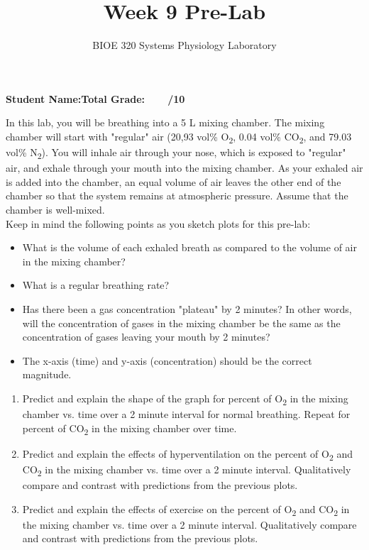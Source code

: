 \documentclass{article}
\title{Week 9 Pre-Lab}
\author{BIOE 320 Systems Physiology Laboratory}
\date{}
\begin{document}
\maketitle
\large

\textbf{Student Name:}\hfill 	\textbf{Total Grade:\ \ \ \ /10}\vspace{0.5cm}

In this lab, you will be breathing into a 5 L mixing chamber. The mixing chamber will start with "regular" air (20,93 vol\% O\textsubscript{2}, 0.04 vol\% CO\textsubscript{2}, and 79.03 vol\% N\textsubscript{2}). You will inhale air through your nose, which is exposed to "regular" air, and exhale through your mouth into the mixing chamber. As your exhaled air is added into the chamber, an equal volume of air leaves the other end of the chamber so that the system remains at atmospheric pressure. Assume that the chamber is well-mixed.\\

Keep in mind the following points as you sketch plots for this pre-lab:\begin{itemize}
	\item What is the volume  of each exhaled breath as compared to the volume of air in the mixing chamber?
	\item What is a regular breathing rate?
	\item Has there been a gas concentration "plateau" by 2 minutes? In other words, will the concentration of gases in the mixing chamber be the same as the concentration of gases leaving your mouth by 2 minutes?
	\item The x-axis (time) and y-axis (concentration) should be the correct magnitude.
\end{itemize}

\begin{enumerate}
	\item Predict and explain the shape of the graph for percent of O\textsubscript{2} in the mixing chamber vs. time over a 2 minute interval for normal breathing. Repeat for percent of CO\textsubscript{2} in the mixing chamber over time.
	\item Predict and explain the effects of hyperventilation on the percent of O\textsubscript{2} and CO\textsubscript{2} in the mixing chamber vs. time over a 2 minute interval. Qualitatively compare and contrast with predictions from the previous plots.
	\item Predict and explain the effects of exercise on the percent of O\textsubscript{2} and CO\textsubscript{2} in the mixing chamber vs. time over a 2 minute interval. Qualitatively compare and contrast with predictions from the previous plots.
\end{enumerate}
\end{document}
